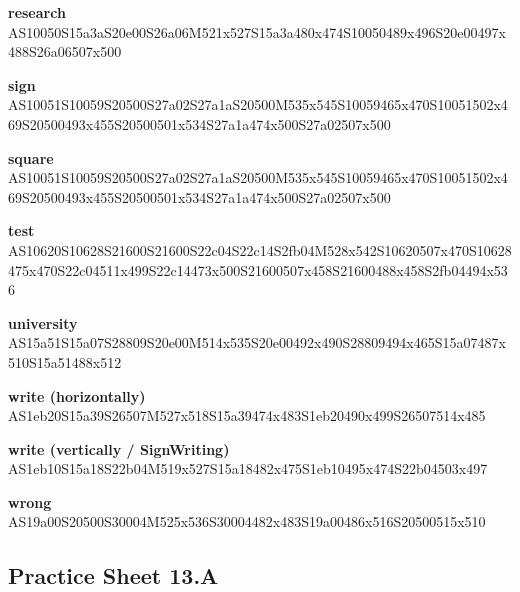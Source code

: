 \documentclass{article}
\begin{document}
\begin{glossary}
\textbf{research}\\
AS10050S15a3aS20e00S26a06M521x527S15a3a480x474S10050489x496S20e00497x488S26a06507x500

\textbf{sign}\\
AS10051S10059S20500S27a02S27a1aS20500M535x545S10059465x470S10051502x469S20500493x455S20500501x534S27a1a474x500S27a02507x500

\textbf{square}\\
AS10051S10059S20500S27a02S27a1aS20500M535x545S10059465x470S10051502x469S20500493x455S20500501x534S27a1a474x500S27a02507x500

\textbf{test}\\
AS10620S10628S21600S21600S22c04S22c14S2fb04M528x542S10620507x470S10628475x470S22c04511x499S22c14473x500S21600507x458S21600488x458S2fb04494x536

\textbf{university}\\
AS15a51S15a07S28809S20e00M514x535S20e00492x490S28809494x465S15a07487x510S15a51488x512

\textbf{write (horizontally)}\\
AS1eb20S15a39S26507M527x518S15a39474x483S1eb20490x499S26507514x485

\textbf{write (vertically / SignWriting)}\\
AS1eb10S15a18S22b04M519x527S15a18482x475S1eb10495x474S22b04503x497

\textbf{wrong}\\
AS19a00S20500S30004M525x536S30004482x483S19a00486x516S20500515x510

\end{glossary}

\subsection{Practice Sheet 13.A}
\end{document}
